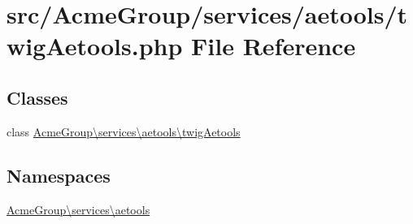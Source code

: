 \hypertarget{twig_aetools_8php}{\section{src/\+Acme\+Group/services/aetools/twig\+Aetools.php File Reference}
\label{twig_aetools_8php}
}
\subsection*{Classes}
\begin{DoxyCompactItemize}
\item 
class \hyperlink{class_acme_group_1_1services_1_1aetools_1_1twig_aetools}{Acme\+Group\textbackslash{}services\textbackslash{}aetools\textbackslash{}twig\+Aetools}
\end{DoxyCompactItemize}
\subsection*{Namespaces}
\begin{DoxyCompactItemize}
\item 
 \hyperlink{namespace_acme_group_1_1services_1_1aetools}{Acme\+Group\textbackslash{}services\textbackslash{}aetools}
\end{DoxyCompactItemize}
